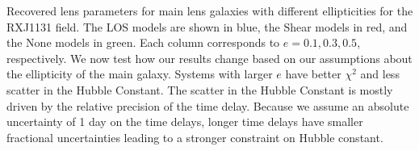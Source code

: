 \label{fig:ecompare} Recovered lens parameters for main lens galaxies with different ellipticities for the RXJ1131 field. The LOS models are shown in blue, the Shear models in red, and the None models in green. Each column corresponds to $e = 0.1,0.3,0.5$, respectively. We now test how our results change based on our assumptions about the ellipticity of the main galaxy. Systems with larger $e$ have better $\chi^2$ and less scatter in the Hubble Constant. The scatter in the Hubble Constant is mostly driven by the relative precision of the time delay. Because we assume an absolute uncertainty of 1 day on the time delays, longer time delays have smaller fractional uncertainties leading to a stronger constraint on Hubble constant.
